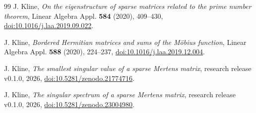\documentclass[11pt,letterpaper]{article}
\numberwithin{equation}{section}
\theoremstyle{definition}
\theoremstyle{remark}
\begin{document}
\begin{thebibliography}{99}
J. Kline,
\emph{On the eigenstructure of sparse matrices related to the prime number theorem},
Linear Algebra Appl. \textbf{584} (2020), 409--430,
\href{https://doi.org/10.1016/j.laa.2019.09.022}{doi:10.1016/j.laa.2019.09.022}.

J. Kline,
\emph{Bordered Hermitian matrices and sums of the M\"obius function},
Linear Algebra Appl. \textbf{588} (2020), 224--237,
\href{https://doi.org/10.1016/j.laa.2019.12.004}{doi:10.1016/j.laa.2019.12.004}.

J. Kline,
\emph{The smallest singular value of a sparse Mertens matrix}, research
release v0.1.0, 2026,
\href{https://doi.org/10.5281/zenodo.21774716}{doi:10.5281/zenodo.21774716}.

J. Kline,
\emph{The singular spectrum of a sparse Mertens matrix}, research release
v0.1.0, 2026,
\href{https://doi.org/10.5281/zenodo.23004980}{doi:10.5281/zenodo.23004980}.
\end{thebibliography}
\end{document}

